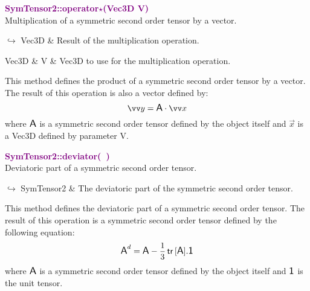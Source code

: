 \textcolor{purple}{\textbf{SymTensor2::operator$\star$(Vec3D V)}}\label{SymTensor2::operator*(Vec3D V)}\\
Multiplication of a symmetric second order tensor by a vector.\vspace*{-0.5em}
\begin{tcolorbox}[grow to left by=-1cm, width=\textwidth-1cm,myArgs,tabularx={l|R}]
$\hookrightarrow$ Vec3D & Result of the multiplication operation.
\end{tcolorbox}

\begin{tcolorbox}[width=\textwidth,myArgs,tabularx={ll|R}]
Vec3D & V & Vec3D to use for the multiplication operation.
\end{tcolorbox}

This method defines the product of a symmetric second order tensor by a vector.
The result of this operation is also a vector defined by:
\begin{equation*}
\overrightarrow{y} = \A \cdot \overrightarrow{x}
\end{equation*}
where $\mbox{\large\ensuremath{\mathsf{A}}}$ is a symmetric second order tensor defined by the object itself and $\overrightarrow{x}$ is a Vec3D defined by parameter V.

\textcolor{purple}{\textbf{SymTensor2::deviator(~)}}\label{SymTensor2::deviator()}\\
Deviatoric part of a symmetric second order tensor.\vspace*{-0.5em}
\begin{tcolorbox}[grow to left by=-1cm, width=\textwidth-1cm,myArgs,tabularx={l|R}]
$\hookrightarrow$ SymTensor2 & The deviatoric part of the symmetric second order tensor.
\end{tcolorbox}

This method defines the deviatoric part of a symmetric second order tensor.
The result of this operation is a symmetric second order tensor defined by the following equation:
\begin{equation*}
\mbox{\large\ensuremath{\mathsf{A}}}^d=\mbox{\large\ensuremath{\mathsf{A}}}-\frac{1}{3}\mbox{\ensuremath{\mathsf{\,tr\,}}}[\mbox{\large\ensuremath{\mathsf{A}}}].\mbox{\large\ensuremath{\mathsf{1}}}
\end{equation*}
where $\mbox{\large\ensuremath{\mathsf{A}}}$ is a symmetric second order tensor defined by the object itself and $\mbox{\large\ensuremath{\mathsf{1}}}$ is the unit tensor.


